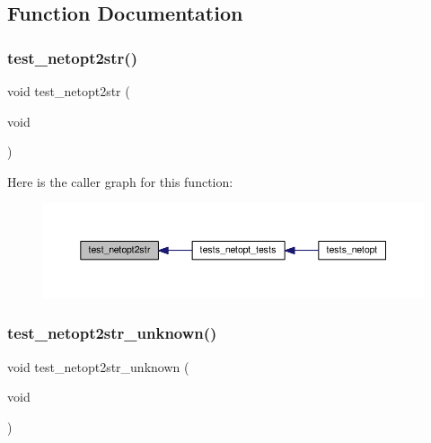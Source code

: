 \subsection{Function Documentation}
\mbox{\label{tests-netopt_8c_a1e06cdb916cbef87a2df25bf54839fd8}} 
\subsubsection{\texorpdfstring{test\+\_\+netopt2str()}{test\_netopt2str()}}
{\footnotesize\ttfamily void test\+\_\+netopt2str (\begin{DoxyParamCaption}\item[{void}]{ }\end{DoxyParamCaption})}

Here is the caller graph for this function\+:
\nopagebreak
\begin{figure}[H]
\begin{center}
\leavevmode
\includegraphics[width=350pt]{tests-netopt_8c_a1e06cdb916cbef87a2df25bf54839fd8_icgraph}
\end{center}
\end{figure}
\mbox{\label{tests-netopt_8c_a0231f9da54bcb6641ba245e21ba19855}} 
\subsubsection{\texorpdfstring{test\+\_\+netopt2str\+\_\+unknown()}{test\_netopt2str\_unknown()}}
{\footnotesize\ttfamily void test\+\_\+netopt2str\+\_\+unknown (\begin{DoxyParamCaption}\item[{void}]{ }\end{DoxyParamCaption})}

